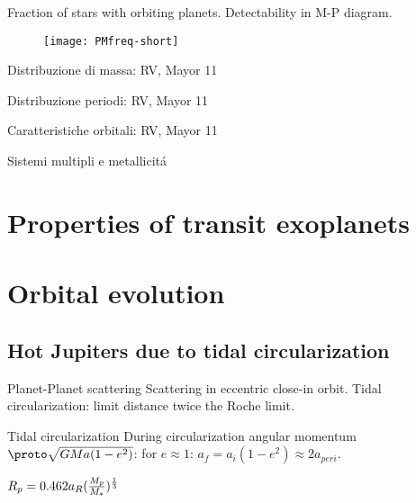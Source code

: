 \begin{frame}{Fraction of stars with orbiting planets. Detectability in M-P diagram.}

\begin{figure}[!ht]\texttt{[image: PMfreq-short]}\label{fig:PMfreq-short}\end{figure}

\end{frame}

\begin{frame}{Distribuzione di massa: RV, Mayor 11}

\end{frame}

\begin{frame}{Distribuzione periodi: RV, Mayor 11}

\end{frame}

\begin{frame}{Caratteristiche orbitali: RV, Mayor 11}

\end{frame}

\begin{frame}{Sistemi multipli e metallicit\'a}

\end{frame}

\section{Properties of transit exoplanets}

\section{Orbital evolution}

\subsection{Hot Jupiters due to tidal circularization}

\begin{frame}{Planet-Planet scattering}
Scattering in eccentric close-in orbit. Tidal circularization: limit distance twice the Roche limit.
\end{frame}

\begin{wordonframe}{Tidal circularization}
During circularization angular momentum $\proto \sqrt{GMa(1-e^2)}$: for $e\approx1$: $a_f=a_i(1-e^2)\approx2a_{peri}$.

$R_p=0.462a_R(\frac{M_p}{M_*})^{\frac{1}{3}}$ 
\end{wordonframe}
